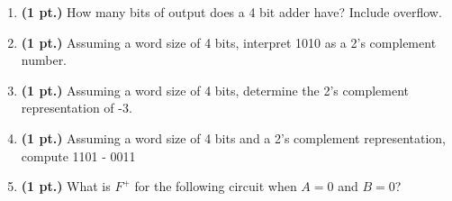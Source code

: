 \documentclass{article}
\begin{document}
\begin{enumerate}
\item {\bf (1 pt.)} How many bits of output does a 4 bit adder have? Include overflow.

\item {\bf (1 pt.)} Assuming a word size of 4 bits, interpret 1010 as a 2's complement
number.

\pagebreak{}
\item {\bf (1 pt.)} Assuming a word size of 4 bits, determine the 2's complement
representation of -3.

\item {\bf (1 pt.)} Assuming a word size of 4 bits and a 2's complement representation,
compute  1101 - 0011

\item {\bf (1 pt.)} What is $F^+$ for the following circuit when
$A=0$ and $B=0$?


\end{enumerate}
\end{document}
